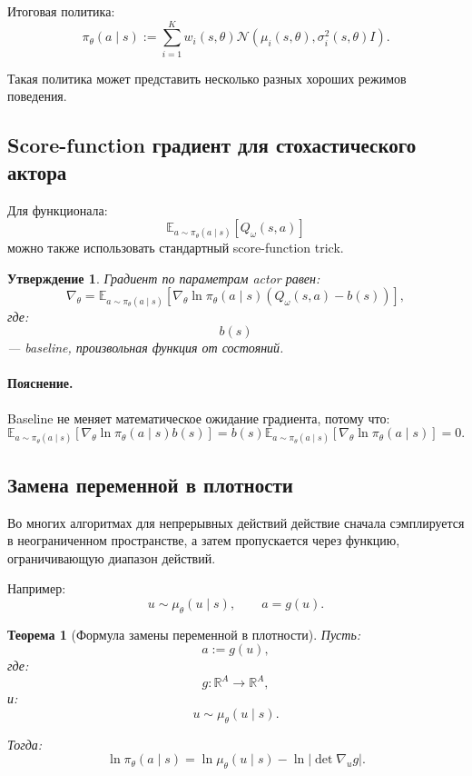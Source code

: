 \documentclass[12pt,a4paper]{article}
\newtheorem{theorem}{Теорема}
\newtheorem{statement}{Утверждение}
\begin{document}
Итоговая политика:
\[
\pi_\theta(a\mid s)
:=
\sum_{i=1}^{K}
w_i(s,\theta)
\mathcal N
\left(
\mu_i(s,\theta),
\sigma_i^2(s,\theta)I
\right).
\]

Такая политика может представить несколько разных хороших режимов поведения.

\subsection{Score-function градиент для стохастического актора}

Для функционала:
\[
\mathbb E_{a\sim\pi_\theta(a\mid s)}
\left[
Q_\omega(s,a)
\right]
\]
можно также использовать стандартный score-function trick.

\begin{statement}
Градиент по параметрам actor равен:
\[
\nabla_\theta
=
\mathbb E_{a\sim\pi_\theta(a\mid s)}
\left[
\nabla_\theta
\ln \pi_\theta(a\mid s)
\left(
Q_\omega(s,a)-b(s)
\right)
\right],
\]
где:
\[
b(s)
\]
--- baseline, произвольная функция от состояний.
\end{statement}

\paragraph{Пояснение.}

Baseline не меняет математическое ожидание градиента, потому что:
\[
\mathbb E_{a\sim\pi_\theta(a\mid s)}
\left[
\nabla_\theta
\ln \pi_\theta(a\mid s)
b(s)
\right]
=
b(s)
\mathbb E_{a\sim\pi_\theta(a\mid s)}
\left[
\nabla_\theta
\ln \pi_\theta(a\mid s)
\right]
=
0.
\]

\subsection{Замена переменной в плотности}

Во многих алгоритмах для непрерывных действий действие сначала сэмплируется в неограниченном пространстве, а затем пропускается через функцию, ограничивающую диапазон действий.

Например:
\[
u\sim \mu_\theta(u\mid s),
\qquad
a=g(u).
\]

\begin{theorem}[Формула замены переменной в плотности]
Пусть:
\[
a:=g(u),
\]
где:
\[
g:\mathbb R^A\to\mathbb R^A,
\]
и:
\[
u\sim\mu_\theta(u\mid s).
\]

Тогда:
\[
\ln \pi_\theta(a\mid s)
=
\ln \mu_\theta(u\mid s)
-
\ln
\left|
\det
\nabla_u g
\right|.
\]
\end{theorem}
\end{document}
